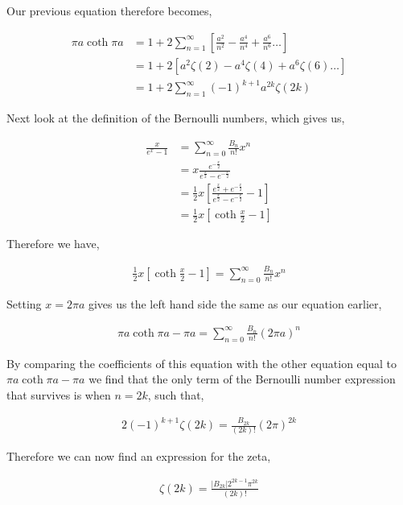\documentclass[11pt]{amsart}
\begin{document}
Our previous equation therefore becomes,

\begin{align*}
  \pi a\coth{\pi a} &= 1 + 2\sum\limits_{n=1}^{\infty}\left[\frac{a^2}{n^2}-\frac{a^4}{n^4}+\frac{a^6}{n^6} \dots\right] \\
                    &= 1 + 2\left[a^2\zeta(2)-a^4\zeta(4)+a^6\zeta(6)\dots \right] \\
                    &= 1 + 2\sum\limits_{n=1}^{\infty} {(-1)}^{k+1}a^{2k}\zeta(2k)
\end{align*}

Next look at the definition of the Bernoulli numbers, which gives us,

\begin{align*}
  \frac{x}{e^x - 1} &= \sum_{n=0}^{\infty} \frac{B_n}{n!}x^n \\
                    &= x \frac{e^{-\frac{x}{2}}}{e^{\frac{x}{2}}-e^{-\frac{x}{2}}} \\
                    &= \frac{1}{2}x\left[\frac{e^{\frac{x}{2}}+e^{-\frac{x}{2}}}{e^{\frac{x}{2}}-e^{-\frac{x}{2}}} - 1\right] \\
                    &= \frac{1}{2}x\left[\coth{\frac{x}{2}} - 1\right]
\end{align*}

Therefore we have,

\begin{align*}
  \frac{1}{2}x\left[\coth{\frac{x}{2}} - 1\right] = \sum\limits_{n=0}^{\infty}\frac{B_n}{n!}x^n
\end{align*}

Setting $x = 2\pi a$ gives us the left hand side the same as our equation earlier,

\begin{align*}
  \pi a\coth{\pi a} - \pi a = \sum\limits_{n=0}^{\infty}\frac{B_n}{n!}{(2\pi a)}^n
\end{align*}

By comparing the coefficients of this equation with the other equation equal to $\pi a\coth{\pi a} - \pi a$ we find that the only term of the Bernoulli number expression that survives is when $n = 2k$, such that,

\begin{align*}
  2{(-1)}^{k+1}\zeta(2k) = \frac{B_{2k}}{(2k)!}{(2\pi)}^{2k}
\end{align*}

Therefore we can now find an expression for the zeta,

\begin{align*}
  \zeta(2k) = \frac{|B_{2k}|2^{2k-1}\pi^{2k}}{(2k)!}
\end{align*}
\end{document}
